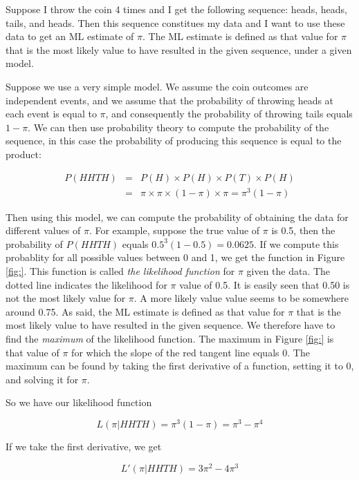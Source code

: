 Suppose I throw the coin 4 times and I get the following sequence: heads, heads, tails, and heads. Then this sequence constitues my data and I want to use these data to get an ML estimate of $\pi$. The ML estimate is defined as that value for $\pi$ that is the most likely value to have resulted in the given sequence, under a given model.

Suppose we use a very simple model. We assume the coin outcomes are independent events, and we assume that the probability of throwing heads at each event is equal to $\pi$, and consequently the probability of throwing tails equals $1-\pi$. We can then use probability theory to compute the probability of the sequence, in this case the probability of producing this sequence is equal to the product:

\begin{eqnarray}
P(HHTH) &=& P(H) \times P(H) \times P(T) \times P(H) \\
&=& \pi \times \pi \times (1-\pi) \times \pi = \pi^3 (1-\pi)
\end{eqnarray}

Then using this model, we can compute the probability of obtaining the data for different values of $\pi$. For example, suppose the true value of $\pi$ is 0.5, then the probability of $P(HHTH)$ equals $0.5^3 (1-0.5) =  0.0625$. If we compute this probablity for all possible values between 0 and 1, we get the function in Figure \ref{fig:}. This function is called \textit{the likelihood function} for $\pi$ given the data. The dotted line indicates the likelihood for $\pi$ value of 0.5. It is easily seen that 0.50 is not the most likely value for $\pi$. A more likely value value seems to be somewhere around 0.75. As said, the ML estimate is defined as that value for $\pi$ that is the most likely value to have resulted in the given sequence. We therefore have to find the \textit{maximum} of the likelihood function. The maximum in Figure \ref{fig:} is that value of $\pi$ for which the slope of the red tangent line equals 0. The maximum can be found by taking the first derivative of a function, setting it to 0, and solving it for $\pi$.

So we have our likelihood function


\begin{equation}
L(\pi|HHTH)=\pi^3 (1-\pi) = \pi ^3 - \pi^4
\end{equation}

If we take the first derivative, we get

\begin{equation}
L'(\pi|HHTH)=3 \pi^2 - 4\pi^3
\end{equation}

